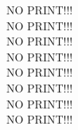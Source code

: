 \begin{huge}
NO PRINT!!! \\
NO PRINT!!! \\
NO PRINT!!! \\
NO PRINT!!! \\
NO PRINT!!! \\
NO PRINT!!! \\
NO PRINT!!! \\
NO PRINT!!! \\
\end{huge}